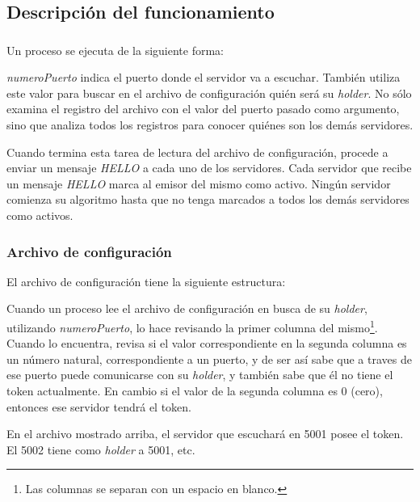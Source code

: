 \subsection{Descripción del funcionamiento}

\subsubsection{}

Un proceso  se ejecuta de la siguiente forma:


\emph{numeroPuerto} indica el puerto donde el servidor va a escuchar. También
utiliza este valor para buscar en el archivo de configuración
 quién será su \emph{holder}. No sólo examina el
registro del archivo con el valor del puerto pasado como argumento, sino que
analiza todos los registros para conocer quiénes son los demás servidores.

Cuando termina esta tarea de lectura del archivo de configuración, procede a
enviar un mensaje \emph{HELLO} a cada uno de los servidores. Cada servidor que
recibe un mensaje \emph{HELLO} marca al emisor del mismo como activo. Ningún
servidor comienza su algoritmo hasta que no tenga marcados a todos los demás
servidores como activos.


\subsubsection{Archivo de configuración }

El archivo de configuración tiene la siguiente estructura:


Cuando un proceso  lee el archivo de configuración en busca de
su \emph{holder}, utilizando \emph{numeroPuerto}, lo hace revisando la primer
columna del mismo\footnote{Las columnas se separan con un espacio en blanco.}.
Cuando lo encuentra, revisa si el valor correspondiente en la segunda columna
es un número natural, correspondiente a un puerto, y de ser así sabe que a
traves de ese puerto puede comunicarse con su \emph{holder}, y también sabe que
él no tiene el token actualmente. En cambio si el valor de la segunda columna es
0 (cero), entonces ese servidor tendrá el token.

En el archivo mostrado arriba, el servidor que escuchará en 5001 posee el token.
El 5002 tiene como \emph{holder} a 5001, etc.


